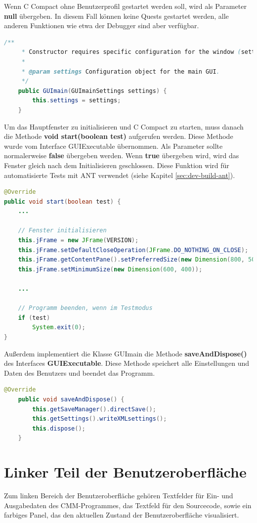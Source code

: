 Wenn C Compact ohne Benutzerprofil gestartet werden soll, wird als Parameter \textbf{null} übergeben. In diesem Fall können keine Quests gestartet werden, alle anderen Funktionen wie etwa der Debugger sind aber verfügbar.

\newpage

\begin{lstlisting}[language=JAVA]
	/**
	 * Constructor requires specific configuration for the window (settings)
	 * 
	 * @param settings Configuration object for the main GUI.
	 */
	public GUImain(GUImainSettings settings) {
		this.settings = settings;
	}
\end{lstlisting}

Um das Hauptfenster zu initialisieren und C Compact zu starten, muss danach die Methode \textbf{void start(boolean test)} aufgerufen werden. Diese Methode wurde vom Interface GUIExecutable übernommen. Als Parameter sollte normalerweise \textbf{false} übergeben werden. Wenn \textbf{true} übergeben wird, wird das Fenster gleich nach dem Initialisieren geschlossen. Diese Funktion wird für automatisierte Tests mit ANT verwendet (siehe Kapitel \ref{sec:dev-build-ant}).

\begin{lstlisting}[language=JAVA]
@Override
public void start(boolean test) {
	...
			
	// Fenster initialisieren
	this.jFrame = new JFrame(VERSION);
	this.jFrame.setDefaultCloseOperation(JFrame.DO_NOTHING_ON_CLOSE);
	this.jFrame.getContentPane().setPreferredSize(new Dimension(800, 500));
	this.jFrame.setMinimumSize(new Dimension(600, 400));
		
	...
		
	// Programm beenden, wenn im Testmodus
	if (test)
		System.exit(0);
}
\end{lstlisting}

Außerdem implementiert die Klasse GUImain die Methode \textbf{saveAndDispose()} des Interfaces \textbf{GUIExecutable}. Diese Methode speichert alle Einstellungen und Daten des Benutzers und beendet das Programm.

\begin{lstlisting}[language=JAVA]
	@Override
	public void saveAndDispose() {
		this.getSaveManager().directSave();
		this.getSettings().writeXMLsettings();
		this.dispose();
	}
\end{lstlisting}

\section{Linker Teil der Benutzeroberfläche}
\label{sec:gui-main-left-0}
Zum linken Bereich der Benutzeroberfläche gehören Textfelder für Ein- und Ausgabedaten des CMM-Programmes, das Textfeld für den Sourcecode, sowie ein farbiges Panel, das den aktuellen Zustand der Benutzeroberfläche visualisiert.

